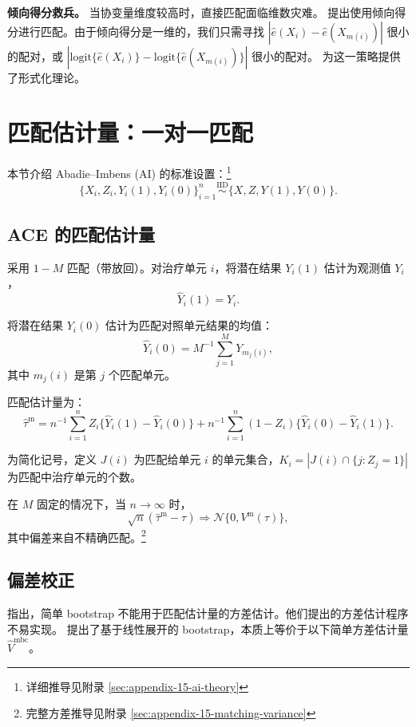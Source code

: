 \textbf{倾向得分救兵。} 当协变量维度较高时，直接匹配面临维数灾难。\citet{RosenbaumRubin:1983b} 提出使用倾向得分进行匹配。由于倾向得分是一维的，我们只需寻找 $|\hat e(X_i) - \hat e(X_{m(i)})|$ 很小的配对，或 $|\mathrm{logit}\{\hat e(X_i)\} - \mathrm{logit}\{\hat e(X_{m(i)})\}|$ 很小的配对。\citet{AbadieImbens:2016} 为这一策略提供了形式化理论。

\section{匹配估计量：一对一匹配}\label{sec:15-nn-matching}

本节介绍 Abadie--Imbens (AI) 的标准设置：\footnote{详细推导见附录 \cref{sec:appendix-15-ai-theory}}
\[
\{X_i, Z_i, Y_i(1), Y_i(0)\}_{i=1}^{n} \stackrel{\mathrm{IID}}{\sim} \{X, Z, Y(1), Y(0)\}.
\]

\subsection{ACE 的匹配估计量}\label{sec:15-ace-estimator}

采用 $1-M$ 匹配（带放回）。对治疗单元 $i$，将潜在结果 $Y_i(1)$ 估计为观测值 $Y_i$，
\[
\hat Y_i(1) = Y_i .
\]

将潜在结果 $Y_i(0)$ 估计为匹配对照单元结果的均值：
\[
\hat Y_i(0) = M^{-1} \sum_{j=1}^{M} Y_{m_j(i)} ,
\]
其中 $m_j(i)$ 是第 $j$ 个匹配单元。

匹配估计量为：
\[
\hat\tau^{\mathrm{m}} = n^{-1} \sum_{i=1}^{n} Z_i \{\hat Y_i(1) - \hat Y_i(0)\} + n^{-1} \sum_{i=1}^{n} (1 - Z_i) \{\hat Y_i(0) - \hat Y_i(1)\}.
\label{eq:15-matching-ace}
\]

为简化记号，定义 $J(i)$ 为匹配给单元 $i$ 的单元集合，$K_i = |J(i) \cap \{j: Z_j = 1\}|$ 为匹配中治疗单元的个数。

\begin{Proposition}[匹配估计量的偏差]\label{prop:15-matching-bias}
在 $M$ 固定的情况下，当 $n \to \infty$ 时，
\[
\sqrt{n}(\hat\tau^{\mathrm{m}} - \tau) \Rightarrow \mathcal{N}\{0, V^{\mathrm{m}}(\tau)\},
\]
其中偏差来自不精确匹配。\footnote{完整方差推导见附录 \cref{sec:appendix-15-matching-variance}}
\end{Proposition}

\subsection{偏差校正}\label{sec:15-bias-correction}

\citet{AbadieImbens:2008} 指出，简单 bootstrap 不能用于匹配估计量的方差估计。他们提出的方差估计程序不易实现。\citet{OtsuRai:2017} 提出了基于线性展开的 bootstrap，本质上等价于以下简单方差估计量 $\hat V^{\mathrm{mbc}}$。

